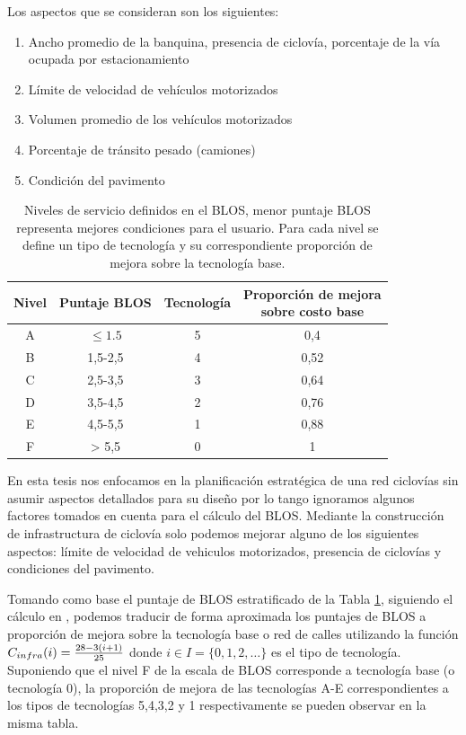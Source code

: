 Los aspectos que se consideran son los siguientes:

\begin{enumerate}
  \item{Ancho promedio de la banquina, presencia de ciclovía, porcentaje de la vía ocupada por estacionamiento}
  \item{Límite de velocidad de vehículos motorizados}
  \item{Volumen promedio de los vehículos motorizados}
  \item{Porcentaje de tránsito pesado (camiones)}
  \item{Condición del pavimento}
\end{enumerate}

\begin{table}[h!]
  \centering
  \begin{tabular}{cccc}
    \toprule
      Nivel & Puntaje BLOS & Tecnología & \shortstack{Proporción de mejora \\ sobre costo base} \\
    \midrule
      A     & $\leq 1.5$   & 5              & 0,4   \\
      B     & 1,5-2,5      & 4              & 0,52  \\
      C     & 2,5-3,5      & 3              & 0,64  \\
      D     & 3,5-4,5      & 2              & 0,76  \\
      E     & 4,5-5,5      & 1              & 0,88  \\
      F     & > 5,5        & 0              & 1     \\
    \bottomrule
  \end{tabular}
  \caption{Niveles de servicio definidos en el BLOS, menor puntaje BLOS representa mejores condiciones para el usuario. Para cada nivel se define un tipo de tecnología y su correspondiente proporción de mejora sobre la tecnología base.}\label{table:blosscores}
\end{table}

En esta tesis nos enfocamos en la planificación estratégica de una red ciclovías sin asumir aspectos detallados para su diseño por lo tango ignoramos algunos factores tomados en cuenta para el cálculo del BLOS. Mediante la construcción de infrastructura de ciclovía solo podemos mejorar alguno de los siguientes aspectos: límite de velocidad de vehiculos motorizados, presencia de ciclovías y condiciones del pavimento.

Tomando como base el puntaje de BLOS estratificado de la Tabla \ref{table:blosscores}, siguiendo el cálculo en \cite{baya2021}, podemos traducir de forma aproximada los puntajes de BLOS a proporción de mejora sobre la tecnología base o red de calles utilizando la función $C_{infra}(i) = {28 - 3 (i + 1) \over 25}$ donde $i \in I = \{0,1,2,\ldots\}$ es el tipo de tecnología. Suponiendo que el nivel F de la escala de BLOS corresponde a tecnología base (o tecnología 0), la proporción de mejora de las tecnologías A-E correspondientes a los tipos de tecnologías 5,4,3,2 y 1 respectivamente se pueden observar en la misma tabla.

